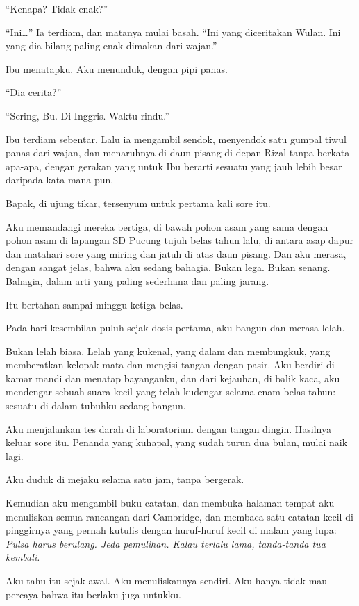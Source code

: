 \documentclass[11pt,twoside,openany]{book}
\makeatletter
\newcommand{\scenebreak}{\par\vspace{0.9em}{\centering\textsc{*\hspace{0.7em}*\hspace{0.7em}*}\par}\vspace{0.9em}\@afterindentfalse\@afterheading}
\makeatother
\begin{document}
``Kenapa? Tidak enak?''

``Ini\ldots{}'' Ia terdiam, dan matanya mulai basah. ``Ini yang diceritakan Wulan. Ini yang dia bilang paling enak dimakan dari wajan.''

Ibu menatapku. Aku menunduk, dengan pipi panas.

``Dia cerita?''

``Sering, Bu. Di Inggris. Waktu rindu.''

Ibu terdiam sebentar. Lalu ia mengambil sendok, menyendok satu gumpal tiwul panas dari wajan, dan menaruhnya di daun pisang di depan Rizal tanpa berkata apa-apa, dengan gerakan yang untuk Ibu berarti sesuatu yang jauh lebih besar daripada kata mana pun.

Bapak, di ujung tikar, tersenyum untuk pertama kali sore itu.

Aku memandangi mereka bertiga, di bawah pohon asam yang sama dengan pohon asam di lapangan SD Pucung tujuh belas tahun lalu, di antara asap dapur dan matahari sore yang miring dan jatuh di atas daun pisang. Dan aku merasa, dengan sangat jelas, bahwa aku sedang bahagia. Bukan lega. Bukan senang. Bahagia, dalam arti yang paling sederhana dan paling jarang.

Itu bertahan sampai minggu ketiga belas.

\scenebreak
Pada hari kesembilan puluh sejak dosis pertama, aku bangun dan merasa lelah.

Bukan lelah biasa. Lelah yang kukenal, yang dalam dan membungkuk, yang memberatkan kelopak mata dan mengisi tangan dengan pasir. Aku berdiri di kamar mandi dan menatap bayanganku, dan dari kejauhan, di balik kaca, aku mendengar sebuah suara kecil yang telah kudengar selama enam belas tahun: sesuatu di dalam tubuhku sedang bangun.

Aku menjalankan tes darah di laboratorium dengan tangan dingin. Hasilnya keluar sore itu. Penanda yang kuhapal, yang sudah turun dua bulan, mulai naik lagi.

Aku duduk di mejaku selama satu jam, tanpa bergerak.

Kemudian aku mengambil buku catatan, dan membuka halaman tempat aku menuliskan semua rancangan dari Cambridge, dan membaca satu catatan kecil di pinggirnya yang pernah kutulis dengan huruf-huruf kecil di malam yang lupa: \emph{Pulsa harus berulang. Jeda pemulihan. Kalau terlalu lama, tanda-tanda tua kembali.}

Aku tahu itu sejak awal. Aku menuliskannya sendiri. Aku hanya tidak mau percaya bahwa itu berlaku juga untukku.
\end{document}
